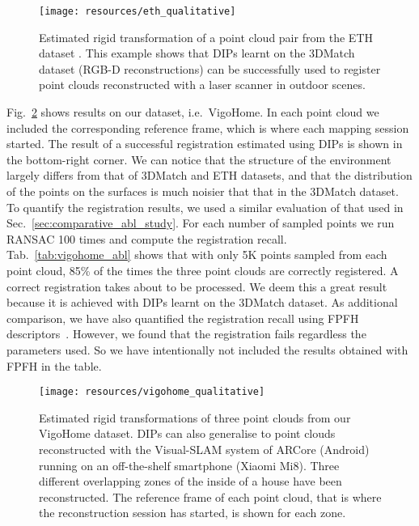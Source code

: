 \documentclass[a4paper,conference]{IEEEtran}
\begin{document}
\begin{figure}[t]
  \centering
  \texttt{[image: resources/eth\_qualitative]}
  \vspace{-6mm}
  \caption{Estimated rigid transformation of a point cloud pair from the ETH dataset \cite{Pomerleau2012}.
  This example shows that DIPs learnt on the 3DMatch dataset (RGB-D reconstructions) can be successfully used to register point clouds reconstructed with a laser scanner in outdoor scenes.}
  \label{fig:eth_qualitative}
\end{figure}


Fig.~\ref{fig:vigohome_qualitative} shows results on our dataset, i.e.~VigoHome.
In each point cloud we included the corresponding reference frame, which is where each mapping session started.
The result of a successful registration estimated using DIPs is shown in the bottom-right corner.
We can notice that the structure of the environment largely differs from that of 3DMatch and ETH datasets, and that the distribution of the points on the surfaces is much noisier that that in the 3DMatch dataset.
To quantify the registration results, we used a similar evaluation of that used in Sec.~\ref{sec:comparative_abl_study}.
For each number of sampled points we run RANSAC 100 times and compute the registration recall.
Tab.~\ref{tab:vigohome_abl} shows that with only 5K points sampled from each point cloud, 85\% of the times the three point clouds are correctly registered.
A correct registration takes about  to be processed.
We deem this a great result because it is achieved with DIPs learnt on the 3DMatch dataset.
As additional comparison, we have also quantified the registration recall using FPFH descriptors~\cite{Rusu2009}. 
However, we found that the registration fails regardless the parameters used.
So we have intentionally not included the results obtained with FPFH in the table.

\begin{figure}[t]
  \centering
  \texttt{[image: resources/vigohome\_qualitative]}
  \vspace{-7mm}
  \caption{Estimated rigid transformations of three point clouds from our VigoHome dataset.
  DIPs can also generalise to point clouds reconstructed with the Visual-SLAM system of ARCore (Android) running on an off-the-shelf smartphone (Xiaomi Mi8).
  Three different overlapping zones of the inside of a house have been reconstructed.
  The reference frame of each point cloud, that is where the reconstruction session has started, is shown for each zone.}
  \label{fig:vigohome_qualitative}
\end{figure}
\end{document}
